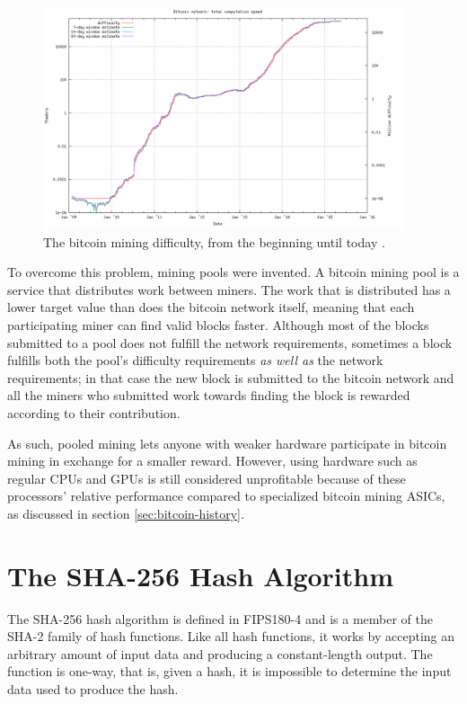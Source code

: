 \begin{figure}[htb]
    \centering
    \includegraphics[width=0.95\textwidth]{Figures/Bitcoin/Difficulty-all}
    \caption{The bitcoin mining difficulty, from the beginning until today \cite{bitcoin-charts}.}
    \label{fig:difficulty}
\end{figure}

To overcome this problem, mining pools were invented. A bitcoin mining pool is a service that distributes
work between miners. The work that is distributed has a lower target value than does the bitcoin network
itself, meaning that each participating miner can find valid blocks faster. Although most of the blocks
submitted to a pool does not fulfill the network requirements, sometimes a block fulfills both the
pool's difficulty requirements \emph{as well as} the network requirements; in that case the new block is
submitted to the bitcoin network and all the miners who submitted work towards finding the block
is rewarded according to their contribution.

As such, pooled mining lets anyone with weaker hardware participate in bitcoin mining in exchange for
a smaller reward. However, using hardware such as regular CPUs and GPUs is still considered unprofitable
because of these processors' relative performance compared to specialized bitcoin mining ASICs, as
discussed in section \ref{sec:bitcoin-history}.

\section{The SHA-256 Hash Algorithm}

The SHA-256 hash algorithm is defined in FIPS180-4 \cite{fips180-4} and is a member of the SHA-2
family of hash functions. Like all hash functions, it works by accepting an arbitrary
amount of input data and producing a constant-length output. The function is one-way,
that is, given a hash, it is impossible to determine the input data used to produce
the hash.

